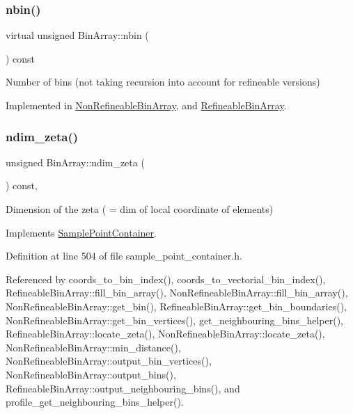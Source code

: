\mbox{\label{classBinArray_aad085bf99d78162120c419f7504d256b}} 
\subsubsection{\texorpdfstring{nbin()}{nbin()}}
{\footnotesize\ttfamily virtual unsigned Bin\+Array\+::nbin (\begin{DoxyParamCaption}{ }\end{DoxyParamCaption}) const\hspace{0.3cm}{\ttfamily [pure virtual]}}

Number of bins (not taking recursion into account for refineable versions) 

Implemented in \hyperlink{classNonRefineableBinArray_af591a06dbe5bbf379c5a52d7a2f1d611}{Non\+Refineable\+Bin\+Array}, and \hyperlink{classRefineableBinArray_a5975657726af982a4d67ff6470abb9d1}{Refineable\+Bin\+Array}.

\mbox{\label{classBinArray_a8e0c4a67385d7dcc714de95ce9965f34}} 
\subsubsection{\texorpdfstring{ndim\+\_\+zeta()}{ndim\_zeta()}}
{\footnotesize\ttfamily unsigned Bin\+Array\+::ndim\+\_\+zeta (\begin{DoxyParamCaption}{ }\end{DoxyParamCaption}) const\hspace{0.3cm}{\ttfamily [inline]}, {\ttfamily [virtual]}}



Dimension of the zeta ( = dim of local coordinate of elements) 



Implements \hyperlink{classSamplePointContainer_af2cfee8a92a28addb59a5533dfd138e7}{Sample\+Point\+Container}.



Definition at line 504 of file sample\+\_\+point\+\_\+container.\+h.



Referenced by coords\+\_\+to\+\_\+bin\+\_\+index(), coords\+\_\+to\+\_\+vectorial\+\_\+bin\+\_\+index(), Refineable\+Bin\+Array\+::fill\+\_\+bin\+\_\+array(), Non\+Refineable\+Bin\+Array\+::fill\+\_\+bin\+\_\+array(), Non\+Refineable\+Bin\+Array\+::get\+\_\+bin(), Refineable\+Bin\+Array\+::get\+\_\+bin\+\_\+boundaries(), Non\+Refineable\+Bin\+Array\+::get\+\_\+bin\+\_\+vertices(), get\+\_\+neighbouring\+\_\+bins\+\_\+helper(), Refineable\+Bin\+Array\+::locate\+\_\+zeta(), Non\+Refineable\+Bin\+Array\+::locate\+\_\+zeta(), Non\+Refineable\+Bin\+Array\+::min\+\_\+distance(), Non\+Refineable\+Bin\+Array\+::output\+\_\+bin\+\_\+vertices(), Non\+Refineable\+Bin\+Array\+::output\+\_\+bins(), Refineable\+Bin\+Array\+::output\+\_\+neighbouring\+\_\+bins(), and profile\+\_\+get\+\_\+neighbouring\+\_\+bins\+\_\+helper().

